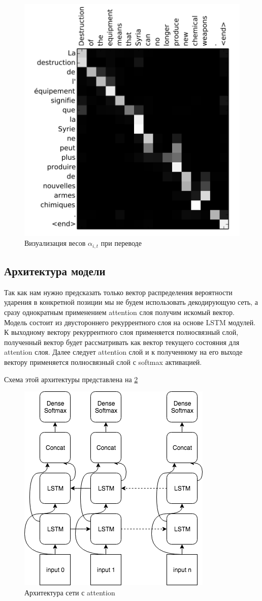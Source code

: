\documentclass[14pt, a4paper, russian]{report}
\begin{document}
\begin{normalsize}
\begin{figure}[H]
	\begin{center}
		\includegraphics[width=0.5\linewidth]{AttentionMap}
	\end{center}
	\caption{\small{Визуализация весов $\alpha_{i,t}$ при переводе}}
	\label{fig:att_map}
\end{figure}


\subsection{Архитектура модели}
Так как нам нужно предсказать только вектор распределения вероятности ударения в конкретной позиции мы не будем использовать декодирующую сеть, а сразу однократным применением attention слоя получим искомый вектор.
Модель состоит из двустороннего рекуррентного слоя на основе LSTM модулей. К выходному вектору рекуррентного слоя применяется полносвязный слой, полученный вектор будет рассматривать как вектор текущего состояния для attention слоя. Далее следует attention слой и к полученному на его выходе вектору применяется полносвязный слой с softmax активацией.

Схема этой архитектуры представлена на \cref{fig:att}

\begin{figure}[H]
	\begin{center}
		\includegraphics[width=0.5\linewidth]{Local}
	\end{center}
	\caption{\small{Архитектура сети с attention}}
	\label{fig:att}
\end{figure}



\end{normalsize}
\end{document}
